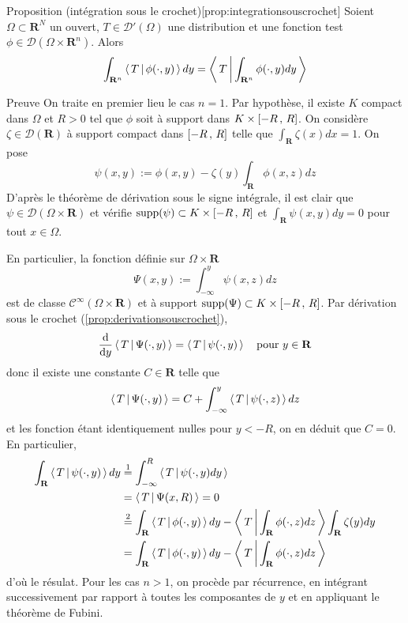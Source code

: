        \begin{omed}{Proposition (intégration sous le crochet)}[prop:integrationsouscrochet]
            Soient $\Omega \subset \mathbf{R}^N$ un ouvert, $T \in \mathcal{D}'(\Omega)$ une distribution et une fonction test $\phi \in \mathcal{D}(\Omega \times \mathbf{R}^n)$. Alors 
            \[ \int_{\mathbf{R}^n} \left< \, T \, \middle| \, \phi(\cdot, y) \, \right> dy = \left< \, T \, \middle| \, \int_{\mathbf{R}^n} \phi(\cdot, y) dy \, \right> \]   
        \end{omed}

        \begin{demo}{Preuve}
            On traite en premier lieu le cas $n = 1$. Par hypothèse, il existe $K$ compact dans $\Omega$ et $R > 0$ tel que $\phi$ soit à support dans $K \times \left[ -R \, , \, R \right]$. On considère $\zeta \in \mathcal{D}(\mathbf{R})$ à support compact dans $\left[ -R \, , \, R \right]$ telle que $\int_{\mathbf{R}} \zeta(x)dx = 1$. On pose 
            \[ \psi(x,y) := \phi(x,y) - \zeta(y) \int_{\mathbf{R}} \phi(x,z)dz \]   
            D’après le théorème de dérivation sous le signe intégrale, il est clair que $\psi \in \mathcal{D}(\Omega \times \mathbf{R})$ et vérifie $\text{supp}(\psi) \subset K \times \left[ -R \, , \, R \right]$ et $\int_{\mathbf{R}} \psi(x,y) dy = 0$ pour tout $x \in \Omega$. 
            
            En particulier, la fonction définie sur $\Omega \times \mathbf{R}$ 
            \[ \Psi(x,y) := \int_{-\infty}^{y} \psi(x,z)dz \]   
            est de classe $\mathcal{C}^{\infty}(\Omega \times \mathbf{R})$ et à support $\text{supp}(\Psi) \subset K \times \left[ -R \, , \, R \right]$. Par dérivation sous le crochet (\ref{prop:derivationsouscrochet}), 
            \[ \frac{\text{d}}{\text{d}y} \left< \, T \, \middle| \, \Psi(\cdot, y) \, \right> = \left< \, T \, \middle| \, \psi(\cdot, y) \, \right> \quad \text{pour } y \in \mathbf{R} \]
            donc il existe une constante $C \in \mathbf{R}$ telle que 
            \[ \left< \, T \, \middle| \, \Psi(\cdot, y) \, \right> = C + \int_{-\infty}^{y } \left< \, T \, \middle| \, \psi(\cdot, z) \, \right> dz \]   
            et les fonction étant identiquement nulles pour $y < -R$, on en déduit que $C = 0$. En particulier, 
            \begin{align*}
                \int_{\mathbf{R}} \left< \, T \, \middle| \, \psi(\cdot,y) \, \right> dy 
                &\overset{1}{=} \int_{-\infty}^R \left< \, T \, \middle| \, \psi(\cdot, y) dy \, \right> \\
                &= \left< \, T \, \middle| \, \Psi(x,R) \, \right> = 0 \\
                &\overset{2}{=} \int_{\mathbf{R}} \left< \, T \, \middle| \, \phi(\cdot, y) \, \right> dy - \left< \, T \, \middle| \, \int_{\mathbf{R}} \phi(\cdot, z)dz \, \right> \int_{\mathbf{R}} \zeta(y)dy \\
                &= \int_{\mathbf{R}} \left< \, T \, \middle| \, \phi(\cdot,y) \, \right>dy - \left< \, T \, \middle| \, \int_{\mathbf{R}} \phi(\cdot, z)dz \, \right>
            \end{align*}
            d’où le résulat. Pour les cas $n > 1$, on procède par récurrence, en intégrant successivement par rapport à toutes les composantes de $y$ et en appliquant le théorème de Fubini.
        \end{demo}

